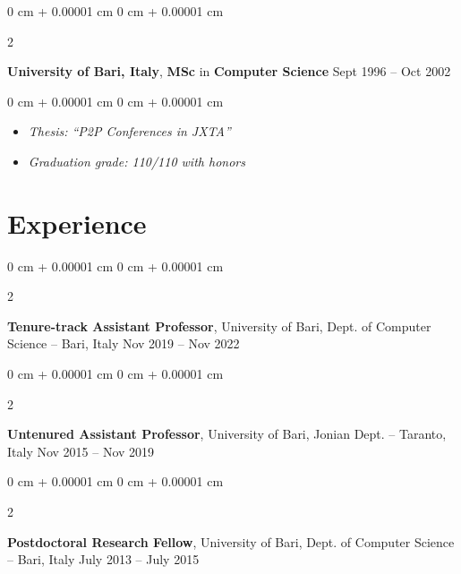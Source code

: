 \documentclass[10pt, a4paper]{article}
\newenvironment{highlights}{
    \begin{itemize}[
        topsep=0.10 cm,
        parsep=0.10 cm,
        partopsep=0pt,
        itemsep=0pt,
        leftmargin=0 cm + 10pt
    ]
}{
    \end{itemize}
} %
\newenvironment{onecolentry}{
    \begin{adjustwidth}{
        0 cm + 0.00001 cm
    }{
        0 cm + 0.00001 cm
    }
}{
    \end{adjustwidth}
} %
\newenvironment{twocolentry}[2][]{
    \onecolentry
    \def\secondColumn{#2}
    \setcolumnwidth{\fill, 4.5 cm}
    \begin{paracol}{2}
}{
    \switchcolumn \raggedleft \secondColumn
    \end{paracol}
    \endonecolentry
} %
\begin{document}
        \vspace{0.2 cm}

        \begin{twocolentry}{
            Sept 1996 – Oct 2002
        }
            \textbf{University of Bari, Italy}, \textbf{MSc} in \textbf{Computer Science}\end{twocolentry}

        \vspace{0.10 cm}
        \begin{onecolentry}
            \begin{highlights}
                \item \textit{Thesis: ``P2P Conferences in JXTA''}
                \item \textit{Graduation grade: 110/110 with honors}
            \end{highlights}
        \end{onecolentry}



    
    \section{Experience}



        
        \begin{twocolentry}{
            Nov 2019 – Nov 2022
        }
            \textbf{Tenure-track Assistant Professor}, University of Bari, Dept. of Computer Science -- Bari, Italy\end{twocolentry}



        \vspace{0.2 cm}

        \begin{twocolentry}{
            Nov 2015 – Nov 2019
        }
            \textbf{Untenured Assistant Professor}, University of Bari, Jonian Dept. -- Taranto, Italy\end{twocolentry}



        \vspace{0.2 cm}

        \begin{twocolentry}{
            July 2013 – July 2015
        }
            \textbf{Postdoctoral Research Fellow}, University of Bari, Dept. of Computer Science -- Bari, Italy\end{twocolentry}
\end{document}
